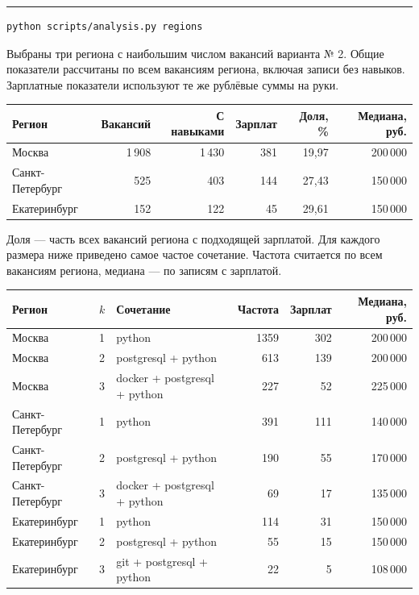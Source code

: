 \documentclass[10pt,a4paper]{article}
\newcommand{\heading}[1]{\Needspace{4\baselineskip}{\LARGE\sffamily\bfseries #1\par}\vspace{1mm}\hrule\vspace{2mm}}
\begin{document}
\newpage\heading{6. Сравнение регионов}

\begin{Verbatim}[fontsize=\footnotesize]
python scripts/analysis.py regions
\end{Verbatim}


Выбраны три региона с наибольшим числом вакансий варианта № 2. Общие показатели рассчитаны по всем вакансиям региона, включая записи без навыков. Зарплатные показатели используют те же рублёвые суммы на руки.

\begingroup\small\setlength{\tabcolsep}{3pt}\renewcommand{\arraystretch}{1.18}
\begin{tabularx}{\linewidth}{Yrrrrr}
\toprule
Регион & Вакансий & С навыками & Зарплат & Доля, \% & Медиана, руб. \\
\midrule
Москва & 1\,908 & 1\,430 & 381 & 19,97 & 200\,000 \\
Санкт-Петербург & 525 & 403 & 144 & 27,43 & 150\,000 \\
Екатеринбург & 152 & 122 & 45 & 29,61 & 150\,000 \\
\bottomrule
\end{tabularx}
\endgroup


Доля --- часть всех вакансий региона с подходящей зарплатой. Для каждого размера ниже приведено самое частое сочетание. Частота считается по всем вакансиям региона, медиана --- по записям с зарплатой.

\begingroup\small\setlength{\tabcolsep}{3pt}\renewcommand{\arraystretch}{1.18}
\begin{tabularx}{\linewidth}{L{31mm}cYrrr}
\toprule
Регион & $k$ & Сочетание & Частота & Зарплат & Медиана, руб. \\
\midrule
Москва & 1 & python & 1359 & 302 & 200\,000 \\
Москва & 2 & postgresql + python & 613 & 139 & 200\,000 \\
Москва & 3 & docker + postgresql + python & 227 & 52 & 225\,000 \\
Санкт-Петербург & 1 & python & 391 & 111 & 140\,000 \\
Санкт-Петербург & 2 & postgresql + python & 190 & 55 & 170\,000 \\
Санкт-Петербург & 3 & docker + postgresql + python & 69 & 17 & 135\,000 \\
Екатеринбург & 1 & python & 114 & 31 & 150\,000 \\
Екатеринбург & 2 & postgresql + python & 55 & 15 & 150\,000 \\
Екатеринбург & 3 & git + postgresql + python & 22 & 5 & 108\,000 \\
\bottomrule
\end{tabularx}
\endgroup
\end{document}
